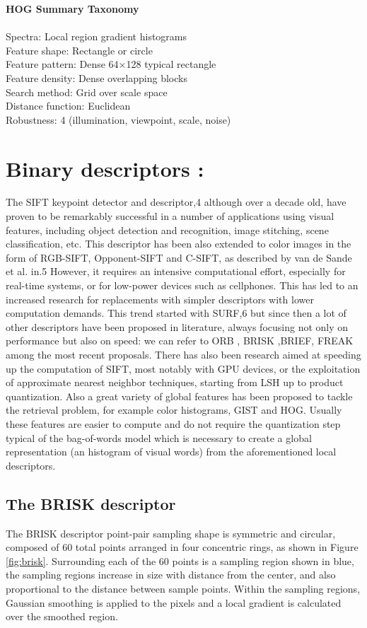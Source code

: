 \textbf{HOG Summary Taxonomy}\\
\\
Spectra: Local region gradient histograms\\
Feature shape: Rectangle or circle\\
Feature pattern: Dense  64$\times$128  typical rectangle\\
Feature density: Dense overlapping blocks\\
Search method: Grid over scale space\\
Distance function: Euclidean\\
Robustness: 4 (illumination, viewpoint, scale, noise)


\section{Binary descriptors :}

The SIFT keypoint detector and descriptor,4 although over a decade old, have proven to be remarkably successful
in a number of applications using visual features, including object detection and recognition, image stitching,
scene classification, etc. This descriptor has been also extended to color images in the form of RGB-SIFT,
Opponent-SIFT and C-SIFT, as described by van de Sande et al. in.5 However, it requires an intensive computational
effort, especially for real-time systems, or for low-power devices such as cellphones. This has led to
an increased research for replacements with simpler descriptors with lower computation demands. This trend
started with SURF,6 but since then a lot of other descriptors have been proposed in literature, always focusing
not only on performance but also on speed: we can refer to ORB , BRISK ,BRIEF, FREAK among the most recent
proposals. There has also been research aimed at speeding up the computation of SIFT, most notably with GPU
devices, or the exploitation of approximate nearest neighbor techniques, starting from LSH up to product
quantization.
Also a great variety of global features has been proposed to tackle the retrieval problem, for example color
histograms, GIST and HOG. Usually these features are easier to compute and do not require the quantization
step typical of the bag-of-words model which is necessary to create a global representation (an histogram of visual
words) from the aforementioned local descriptors.

\subsection{The BRISK descriptor}
The BRISK descriptor \cite{AA} point-pair sampling shape is symmetric and circular,
composed of 60 total points arranged in four concentric rings, as shown in Figure \ref{fig:brisk}.
Surrounding each of the 60 points is a sampling region shown in blue, the sampling
regions increase in size with distance from the center, and also proportional to the
distance between sample points. Within the sampling regions, Gaussian smoothing is
applied to the pixels and a local gradient is calculated over the smoothed region.

